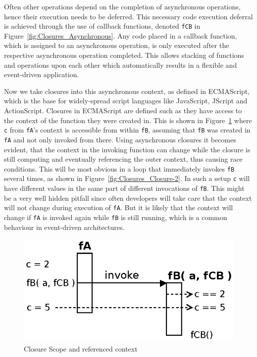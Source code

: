 Often other operations depend on the completion of asynchronous operations, hence their execution needs to be deferred.
This necessary code execution deferral is achieved through the use of callback functions, denoted \texttt{fCB} in Figure~\ref{fig:Closures_Asynchronous}.
Any code placed in a callback function, which is assigned to an asynchronous operation, is only executed after the respective asynchronous operation completed.
This allows stacking of functions and operations upon each other which automatically results in a flexible and event-driven application.


Now we take closures into this asynchronous context, as defined in ECMAScript\cite{EcmaScript}, which is the base for widely-spread script languages like JavaScript, JScript and ActionScript.
Closures in ECMAScript\cite{EcmaScript} are defined such as they have access to the context of the function they were created in.
This is shown in Figure~\ref{fig:Closures_Closure-1} where \texttt{c} from \texttt{fA}'s context is accessible from within \texttt{fB}, assuming that \texttt{fB} was created in \texttt{fA} and not only invoked from there.
Using asynchronous closures it becomes evident, that the context in the invoking function can change while the closure is still computing and eventually referencing the outer context, thus causing race conditions.
This will be most obvious in a loop that immediately invokes \texttt{fB} several times, as shown in Figure~\ref{fig:Closures_Closure-2}.
In such a setup \texttt{c} will have different values in the same part of different invocations of \texttt{fB}.
This might be a very well hidden pitfall since often developers will take care that the context will not change during execution of \texttt{fA}.
But it is likely that the context will change if \texttt{fA} is invoked again while \texttt{fB} is still running, which is a common behaviour in event-driven architectures.
\begin{figure}[!ht]
	\centering
  \includegraphics{figures/Closures_Closure-1}
	\caption{Closure Scope and referenced context}
	\label{fig:Closures_Closure-1}
\end{figure}
